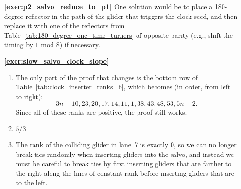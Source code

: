 \begin{multicols}{2}
\begin{itemize}[leftmargin=0em]
\begin{multicols}{2}
\begin{enumerate}[leftmargin=1.5em]
				\item[\bf\color{ocre}(b)]  \\
			\end{enumerate}
		\end{multicols}
		

		
		
		\item[\bf\color{ocre}\sffamily\ref{exer:p2_salvo_reduce_to_p1}] One solution would be to place a 180-degree reflector in the path of the glider that triggers the clock seed, and then replace it with one of the reflectors from Table~\ref{tab:180_degree_one_time_turners} of opposite parity (e.g., shift the timing by $1$ mod $8$) if necessary.\\
		
		
		\item[\bf\color{ocre}\sffamily\ref{exer:slow_salvo_clock_slope}]
		\begin{enumerate}[leftmargin=1.5em,label=\bf\color{ocre}(\alph*)]
			\item The only part of the proof that changes is the bottom row of Table~\ref{tab:clock_inserter_ranks_b}, which becomes (in order, from left to right): $$3n-10, 23, 20, 17, 14, 11, 1, 38, 43, 48, 53, 5n-2.$$ Since all of these ranks are positive, the proof still works.
			
			\item $5/3$
			
			\item The rank of the colliding glider in lane~7 is exactly $0$, so we can no longer break ties randomly when inserting gliders into the salvo, and instead we must be careful to break ties by first inserting gliders that are farther to the right along the lines of constant rank before inserting gliders that are to the left.
			

\end{enumerate}
\end{itemize}
\end{multicols}
